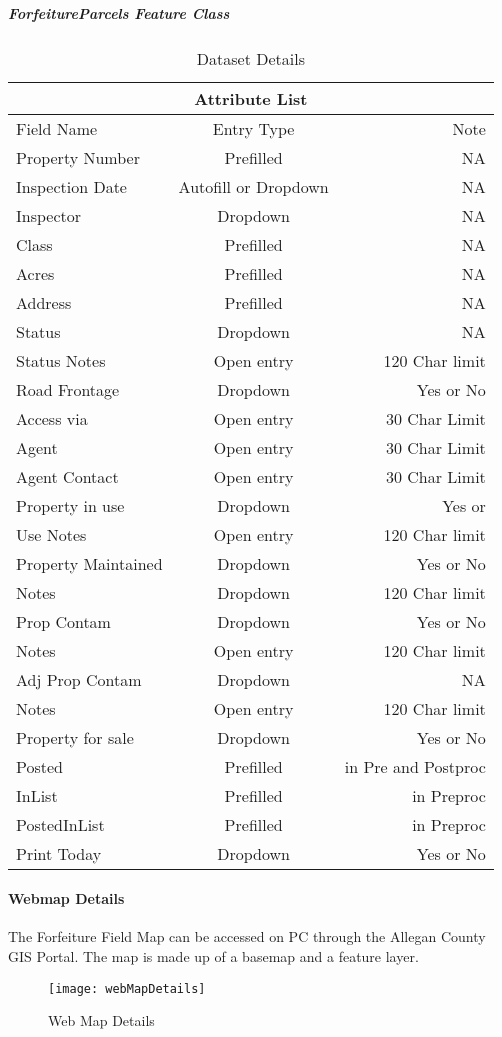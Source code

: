 \documentclass[class=article , crop=false, titlepage, twoside, multi={itemize, figure, verbatim}, float=false]{standalone}
\begin{document}
\clearpage
\subparagraph{ForfeitureParcels Feature Class}
\begin{table}
\centering
\begin{tabular}{|l|c|r|}
\hline
\multicolumn{3}{|c|}{Attribute List} \\
\hline
Field Name&Entry Type&Note\\ \hline
Property Number&Prefilled&NA\\
Inspection Date&{\scriptsize Autofill or Dropdown}&NA\\
Inspector&Dropdown&NA\\
Class&Prefilled&NA\\
Acres&Prefilled&NA\\
Address&Prefilled&NA\\
Status&Dropdown&NA\\
Status Notes&Open entry&120 Char limit\\
Road Frontage&Dropdown&Yes or No\\
Access via&Open entry&30 Char Limit\\
Agent&Open entry&30 Char Limit\\
Agent Contact&Open entry&30 Char Limit\\
Property in use&Dropdown&Yes or\\
Use Notes&Open entry&120 Char limit\\
Property Maintained&Dropdown&Yes or No\\
Notes&Dropdown&120 Char limit\\
Prop Contam&Dropdown&Yes or No\\
Notes&Open entry&120 Char limit\\
Adj Prop Contam&Dropdown&NA\\
Notes&Open entry&120 Char limit\\
Property for sale&Dropdown&Yes or No\\
Posted&Prefilled&in Pre and Postproc\\
InList&Prefilled&in Preproc\\
PostedInList&Prefilled&in Preproc\\
Print Today&Dropdown&Yes or No\\ \hline
\end{tabular}
\caption{Dataset Details}
\end{table}

\clearpage
\paragraph{Webmap Details}The Forfeiture Field Map can be accessed on PC through the Allegan County GIS Portal.  The map is made up of a basemap and a feature layer.
\begin{figure}[h!]
\centering
\texttt{[image: webMapDetails]}
\caption{Web Map Details}
\end{figure}
\end{document}
